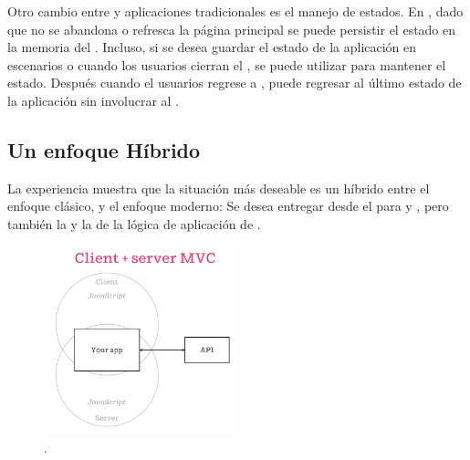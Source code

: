 Otro cambio entre \spa y aplicaciones \webINT tradicionales es el manejo de estados. En \spa, dado que no se abandona o refresca la página \webINT principal se puede persistir el estado en la memoria del \browserINT. Incluso, si se desea guardar el estado de la aplicación en escenarios \offline o cuando los usuarios cierran el \browserINT, se puede utilizar \htmlfive \storage para mantener el estado. Después cuando el usuarios regrese a \online, puede regresar al último estado de la aplicación sin involucrar al \serverAS.

\subsection{Un enfoque Híbrido}

La experiencia muestra que la situación más deseable es un híbrido entre el enfoque clásico, y el enfoque moderno: Se desea entregar \htmlNAME \fullyFormedCPT desde el \serverAS para \performanceQA y \seoINT, pero también la \speedQA y la \flexibilityQA de la lógica de aplicación de \clientSideAS.

\begin{figure}[h!]
	\centering
	\includegraphics[width=0.5\textwidth]{figuras/estadoArte/isomorphic-client-server-mvc.png}
	\caption{\isomorphicAS  \clientAS \serverAS \mvcAS.}
	\label{figure:client_side_mvc}
\end{figure}


